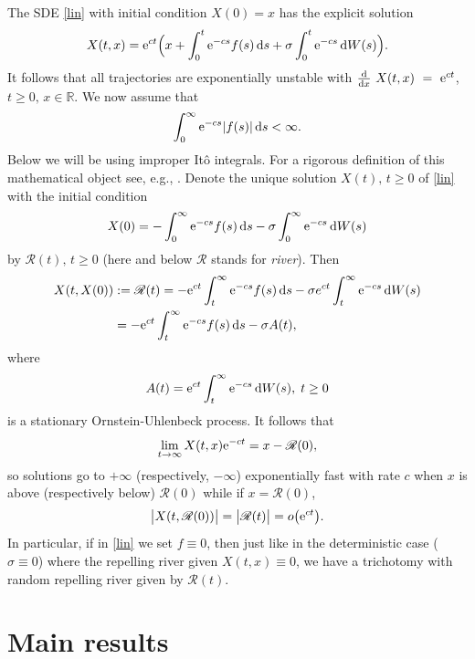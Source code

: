 \documentclass[sn-mathphys-num]{sn-jnl}
\theoremstyle{definition}
\newcommand{\scr}[1]{\mathscr #1}
\numberwithin{equation}{section} \theoremstyle{remark}
\renewcommand{\d}{\hbox{d}}
\def\R{\mathbb R}
\def\d{\text{\rm{d}}} \def\bb{\beta} \def\aa{\alpha} \def\D{\scr D}
\def\RR{\mathscr R}
\def\e{\text{\rm{e}}}
\newcommand{\1}{\mathbbm{1}}
\begin{document}
The SDE \eqref{lin} with initial condition $X(0)=x$ has the explicit solution
$$
X(t,x)=\e^{ct}\Big( x + \int_0^t \e^{-cs}f(s)\,\d s + \sigma
\int_0^t\e^{-cs}\,\d W(s)\Big).
$$
It follows that all trajectories are exponentially unstable with
$\frac{\d}{\d x}~X(t,x)~=~\e^{ct}$, $t \geq 0,\,x \in \R$.
We now assume that
$$
\int_0^\infty \e^{-cs}|f(s)|\,\d s<\infty.
$$
Below we will be using improper It\^o integrals. For a rigorous
definition of this mathematical object see, e.g., \cite[Definition
25.10]{Klenke}. Denote the unique solution $X(t),\,t \geq 0$ of
\eqref{lin} with the initial condition
$$
X(0)=-\int_0^\infty\e^{-cs}f(s)\,\d s - \sigma \int_0^\infty\e^{-cs}\,\d W(s)
$$
by $\RR(t),\,t \geq 0$ (here and below $\RR$ stands for {\em river}).
Then
\begin{align*}
  X(t, X(0)) & := \RR(t)= -\e^{ct} \int_t^\infty\e^{-cs}f(s)\,\d s -
                \sigma e^{ct}  \int_t^\infty\e^{-cs}\,\d W(s)\\
  & =  -\e^{ct} \int_t^\infty\e^{-cs}f(s)\,\d s -\sigma A(t),
\end{align*}
where
$$
A(t)= \e^{ct}  \int_t^\infty\e^{-cs}\,\d W(s),\;t \geq 0
$$
is a stationary Ornstein-Uhlenbeck process. It follows that
$$
\lim_{t\to \infty}X(t,x)\e^{-ct}=x-\RR(0),
$$
so solutions go to $+\infty$ (respectively, $-\infty$) exponentially
fast with rate $c$ when $x$ is above (respectively below) $\RR(0)$ while
if  $x=\RR(0)$,
\[
  \big|X(t,\RR(0))\big| = \big|\RR(t)\big|=o\big(\e^{ct}\big).
\]
In particular, if in \eqref{lin} we set $f \equiv 0$, then just like in
the deterministic case ($\sigma \equiv 0$) where
the repelling river given  $X(t,x)\equiv 0$,  we have a trichotomy
with random repelling river given by $\RR(t)$.  

  





\section{Main results}~\label{stoch}
\end{document}
